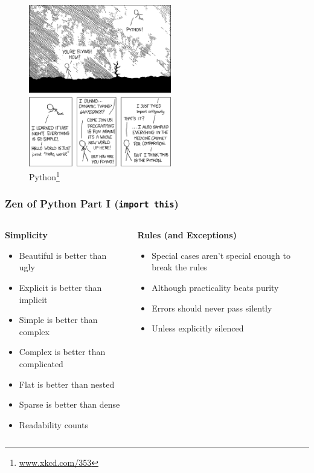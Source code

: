 \documentclass{beamer}
\begin{document}
  \begin{frame}
    \begin{figure}
      \begin{center}
      \includegraphics[height=200pt,keepaspectratio]{xkcd_python.png}
      \caption
      {
        Python\footnote{\url{www.xkcd.com/353}} 
      }
      \end{center}
    \end{figure}
  \end{frame}
 
  \begin{frame}
    \frametitle{Zen of Python Part I (\texttt{import this})}
    \begin{columns}
      \begin{column}{0.55\textwidth}
	\textbf{Simplicity}
        \begin{itemize}
          \item Beautiful is better than ugly
          \item Explicit is better than implicit
          \item Simple is better than complex
          \item Complex is better than complicated
	  \item Flat is better than nested
	  \item Sparse is better than dense
	  \item Readability counts
        \end{itemize}
      \end{column}
      
      \begin{column}{0.45\textwidth}
        \textbf{Rules (and Exceptions)}
        \begin{itemize}
	  \item Special cases aren't special enough to break the rules
	  \item Although practicality beats purity
          \item Errors should never pass silently
          \item Unless explicitly silenced
        \end{itemize}
      \end{column}
    \end{columns}
  \end{frame}
\end{document}
